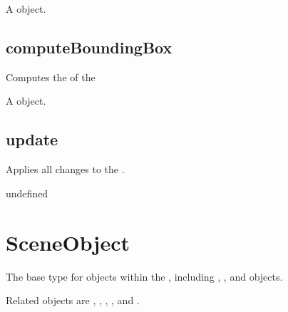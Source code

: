 \documentclass[letterpaper,12pt,english,openany,oneside]{sphinxmanual}
\begin{document}
\label{\detokenize{JS_3D_API:section-106}}\label{\detokenize{JS_3D_API:returns-106}}

A  object.


\subsection{computeBoundingBox}
\label{\detokenize{JS_3D_API:computeboundingbox-1}}\label{\detokenize{JS_3D_API:id31}}
Computes the  of the 

\label{\detokenize{JS_3D_API:syntax-106}}

\begin{sphinxVerbatim}[commandchars=\\\{\}]
\end{sphinxVerbatim}
\label{\detokenize{JS_3D_API:returns-107}}

A  object.


\subsection{update}
\label{\detokenize{JS_3D_API:update}}
Applies all changes to the .

\label{\detokenize{JS_3D_API:syntax-107}}

\begin{sphinxVerbatim}[commandchars=\\\{\}]
\end{sphinxVerbatim}
\label{\detokenize{JS_3D_API:returns-108}}

undefined


\section{SceneObject}
\label{\detokenize{JS_3D_API:sceneobject}}
The base type for objects within the  , including  ,  , and  objects.

Related objects are , , , , and .
\end{document}
